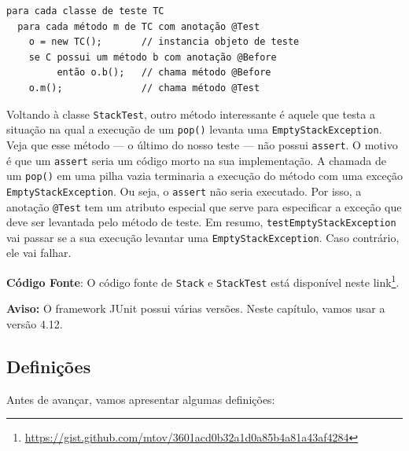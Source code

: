 \documentclass[
  11pt,
  twoside]{book}
\newcommand{\passthrough}[1]{#1}
\DeclareRobustCommand{\href}[2]{#2\footnote{\url{#1}}}
\newenvironment{aviso}{\centering \vspace{1.5ex} \begin{tcolorbox}[breakable, colback=backcolor, width=4.9in]}{\end{tcolorbox} \vspace{1.5ex}}
\begin{document}
\begin{lstlisting}
para cada classe de teste TC
  para cada método m de TC com anotação @Test
    o = new TC();       // instancia objeto de teste
    se C possui um método b com anotação @Before
         então o.b();   // chama método @Before
    o.m();              // chama método @Test
\end{lstlisting}

Voltando à classe \passthrough{\lstinline!StackTest!}, outro método
interessante é aquele que testa a situação na qual a execução de um
\passthrough{\lstinline!pop()!} levanta uma
\passthrough{\lstinline!EmptyStackException!}. Veja que esse método ---
o último do nosso teste --- não possui \passthrough{\lstinline!assert!}.
O motivo é que um \passthrough{\lstinline!assert!} seria um código morto
na sua implementação. A chamada de um \passthrough{\lstinline!pop()!} em
uma pilha vazia terminaria a execução do método com uma exceção
\passthrough{\lstinline!EmptyStackException!}. Ou seja, o
\passthrough{\lstinline!assert!} não seria executado. Por isso, a
anotação \passthrough{\lstinline!@Test!} tem um atributo especial que
serve para especificar a exceção que deve ser levantada pelo método de
teste. Em resumo, \passthrough{\lstinline!testEmptyStackException!} vai
passar se a sua execução levantar uma
\passthrough{\lstinline!EmptyStackException!}. Caso contrário, ele vai
falhar.

\textbf{Código Fonte}: O código fonte de \passthrough{\lstinline!Stack!}
e \passthrough{\lstinline!StackTest!} está disponível neste
\href{https://gist.github.com/mtov/3601acd0b32a1d0a85b4a81a43af4284}{link}.

\begin{aviso}

\textbf{Aviso:} O framework JUnit possui várias versões. Neste capítulo,
vamos usar a versão 4.12.

\end{aviso}

\hypertarget{definiuxe7uxf5es}{%
\subsection{Definições}\label{definiuxe7uxf5es}}


Antes de avançar, vamos apresentar algumas definições:
\end{document}
